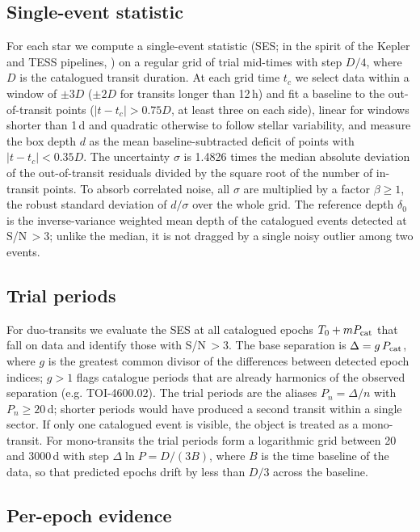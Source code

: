 \documentclass[fleqn,usenatbib]{mnras}
\newcommand{\Pcat}{\ensuremath{P_{\rm cat}}}
\begin{document}
\subsection{Single-event statistic}
\label{sec:ses}

For each star we compute a single-event statistic (SES; in the spirit of the Kepler and TESS pipelines, \citealt{Jenkins2002}) on a regular grid of trial mid-times with step $D/4$, where $D$ is the catalogued transit duration. At each grid time $t_c$ we select data within a window of $\pm3D$ ($\pm2D$ for transits longer than 12\,h) and fit a baseline to the out-of-transit points ($|t - t_c| > 0.75D$, at least three on each side), linear for windows shorter than 1\,d and quadratic otherwise to follow stellar variability, and measure the box depth $d$ as the mean baseline-subtracted deficit of points with $|t - t_c| < 0.35D$. The uncertainty $\sigma$ is 1.4826 times the median absolute deviation of the out-of-transit residuals divided by the square root of the number of in-transit points. To absorb correlated noise, all $\sigma$ are multiplied by a factor $\beta \geq 1$, the robust standard deviation of $d/\sigma$ over the whole grid. The reference depth $\delta_0$ is the inverse-variance weighted mean depth of the catalogued events detected at S/N\,$> 3$; unlike the median, it is not dragged by a single noisy outlier among two events.

\subsection{Trial periods}
\label{sec:trials}

For duo-transits we evaluate the SES at all catalogued epochs $T_0 + m\Pcat$ that fall on data and identify those with S/N\,$> 3$. The base separation is $\Delta = g\,\Pcat$, where $g$ is the greatest common divisor of the differences between detected epoch indices; $g > 1$ flags catalogue periods that are already harmonics of the observed separation (e.g. TOI-4600.02). The trial periods are the aliases $P_n = \Delta/n$ with $P_n \geq 20$\,d; shorter periods would have produced a second transit within a single sector. If only one catalogued event is visible, the object is treated as a mono-transit. For mono-transits the trial periods form a logarithmic grid between 20 and 3000\,d with step $\Delta\ln P = D/(3B)$, where $B$ is the time baseline of the data, so that predicted epochs drift by less than $D/3$ across the baseline.

\subsection{Per-epoch evidence}
\end{document}
